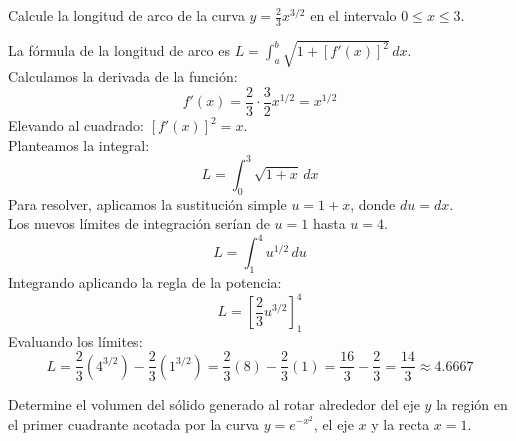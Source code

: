 \documentclass[11pt,paper=a4,answers, addpoints]{exam}
\begin{document}
\begin{questions}

\question Calcule la longitud de arco de la curva $y = \frac{2}{3}x^{3/2}$ en el intervalo $0 \le x \le 3$.


\begin{solution}
La fórmula de la longitud de arco es $L = \int_a^b \sqrt{1 + [f'(x)]^2} \, dx$. \\
Calculamos la derivada de la función: 
\[ f'(x) = \frac{2}{3} \cdot \frac{3}{2}x^{1/2} = x^{1/2} \]
Elevando al cuadrado: $[f'(x)]^2 = x$. \\
Planteamos la integral:
\[ L = \int_0^3 \sqrt{1 + x} \, dx \]
Para resolver, aplicamos la sustitución simple $u = 1 + x$, donde $du = dx$. \\
Los nuevos límites de integración serían de $u=1$ hasta $u=4$.
\[ L = \int_1^4 u^{1/2} \, du \]
Integrando aplicando la regla de la potencia:
\[ L = \left[ \frac{2}{3}u^{3/2} \right]_1^4 \]
Evaluando los límites:
\[ L = \frac{2}{3}(4^{3/2}) - \frac{2}{3}(1^{3/2}) = \frac{2}{3}(8) - \frac{2}{3}(1) = \frac{16}{3} - \frac{2}{3} = \frac{14}{3} \approx 4.6667 \]
\end{solution}

\vspace{5mm}

\question Determine el volumen del sólido generado al rotar alrededor del eje $y$ la región en el primer cuadrante acotada por la curva $y = e^{-x^2}$, el eje $x$ y la recta $x = 1$.



\end{questions}
\end{document}
